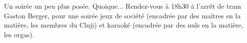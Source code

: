 Un soirée un peu plus posée. Quoique... Rendez-vous à 18h30 à l'arrêt de tram Gaston Berger, pour une soirée jeux de société (encadrée par des maîtres
en la matière, les membres du Cluji) et karaoké (encadrée
par des nuls en la matière, les orgas).

